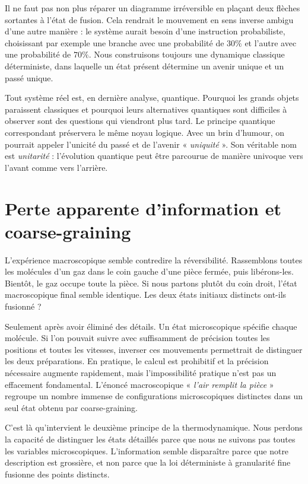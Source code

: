 Il ne faut pas non plus réparer un diagramme irréversible en plaçant deux flèches sortantes à l’état de fusion. Cela rendrait le mouvement en sens inverse ambigu d’une autre manière : le système aurait besoin d’une instruction probabiliste, choisissant par exemple une branche avec une probabilité de \(30\%\) et l’autre avec une probabilité de \(70\%\). Nous construisons toujours une dynamique classique déterministe, dans laquelle un état présent détermine un avenir unique et un passé unique.

Tout système réel est, en dernière analyse, quantique. Pourquoi les grands objets paraissent classiques et pourquoi leurs alternatives quantiques sont difficiles à observer sont des questions qui viendront plus tard. Le principe quantique correspondant préservera le même noyau logique. Avec un brin d’humour, on pourrait appeler l’unicité du passé et de l’avenir « \emph{uniquité} ». Son véritable nom est \emph{unitarité} : l’évolution quantique peut être parcourue de manière univoque vers l’avant comme vers l’arrière.

\section{Perte apparente d’information et coarse-graining}

L’expérience macroscopique semble contredire la réversibilité. Rassemblons toutes les molécules d’un gaz dans le coin gauche d’une pièce fermée, puis libérons-les. Bientôt, le gaz occupe toute la pièce. Si nous partons plutôt du coin droit, l’état macroscopique final semble identique. Les deux états initiaux distincts ont-ils fusionné ?

Seulement après avoir éliminé des détails. Un état microscopique spécifie chaque molécule. Si l’on pouvait suivre avec suffisamment de précision toutes les positions et toutes les vitesses, inverser ces mouvements permettrait de distinguer les deux préparations. En pratique, le calcul est prohibitif et la précision nécessaire augmente rapidement, mais l’impossibilité pratique n’est pas un effacement fondamental. L’énoncé macroscopique « \emph{l’air remplit la pièce} » regroupe un nombre immense de configurations microscopiques distinctes dans un seul état obtenu par coarse-graining.

C’est là qu’intervient le deuxième principe de la thermodynamique. Nous perdons la capacité de distinguer les états détaillés parce que nous ne suivons pas toutes les variables microscopiques. L’information semble disparaître parce que notre description est grossière, et non parce que la loi déterministe à granularité fine fusionne des points distincts.

